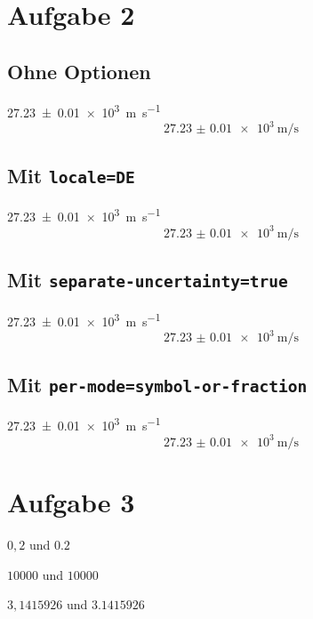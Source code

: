 \documentclass{scrartcl}
\begin{document}
\section*{Aufgabe 2}

\subsection*{Ohne Optionen}

\SI{27.23(1)e3}{\meter\per\second}
\begin{equation}
  \SI{27.23(1)e3}{\meter\per\second} 
\end{equation}

\subsection*{Mit \texttt{locale=DE}}

\SI{27.23(1)e3}{\meter\per\second}
\begin{equation}
  \SI{27.23(1)e3}{\meter\per\second} 
\end{equation}

\subsection*{Mit \texttt{separate-uncertainty=true}}

\SI{27.23(1)e3}{\meter\per\second}
\begin{equation}
  \SI{27.23(1)e3}{\meter\per\second} 
\end{equation}

\subsection*{Mit \texttt{per-mode=symbol-or-fraction}}

\SI{27.23(1)e3}{\meter\per\second}
\begin{equation} 
  \SI{27.23(1)e3}{\meter\per\second} 
\end{equation}

\section*{Aufgabe 3}

$0,2$ und $\num{0,2}$

$10000$ und $\num{10000}$

$3,1415926$ und $\num{3,1415926}$
\end{document}
